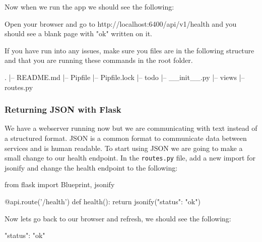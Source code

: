 \documentclass{csse4400}
\begin{document}
Now when we run the app we should see the following:


Open your browser and go to http://localhost:6400/api/v1/health and you should see a blank page with "ok" written on it.

If you have run into any issues, make sure you files are in the following structure and that you are running these commands in the root folder.

\begin{code}[language=bash,numbers=none]{}
  .
  |-- README.md
  |-- Pipfile
  |-- Pipfile.lock
  |-- todo
      |-- __init__.py
      |-- views
          |-- routes.py
\end{code}

\subsubsection{Returning JSON with Flask}

We have a webserver running now but we are communicating with text instead of a structured format. JSON is a common format to communicate data between services and is human readable. To start using JSON we are going to make a small change to our health endpoint. In the \texttt{routes.py} file, add a new import for jsonify and change the health endpoint to the following:

\begin{code}[language=python]{}
from flask import Blueprint, jsonify
\end{code}

\begin{code}[language=python,firstnumber=6]{}
  @api.route('/health')
  def health():
      return jsonify({"status": "ok"})
\end{code}

Now lets go back to our browser and refresh, we should see the following:

\begin{code}[language=json,numbers=none]{}
  {
    "status": "ok"
  }
\end{code}
\end{document}
